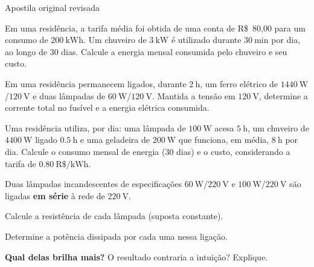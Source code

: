 \begin{questao}[2]{Apostila original revisada}

Em uma residência, a tarifa média foi obtida de uma conta de
R\$~80,00 para um consumo de $\SI{200}{\kilo\watt\hour}$. Um chuveiro de
$\SI{3}{\kilo\watt}$ é utilizado durante $\SI{30}{\minute}$ por dia, ao longo de
30 dias. Calcule a energia mensal consumida pelo chuveiro e seu custo.


\end{questao}

\blocoaprofundamento
\begin{questao}[3]{}

Em uma residência permanecem ligados, durante $\SI{2}{\hour}$, um ferro elétrico
de $\SI{1440}{\watt}$/$\SI{120}{\volt}$ e duas lâmpadas de
$\SI{60}{\watt}$/$\SI{120}{\volt}$. Mantida a tensão em $\SI{120}{\volt}$,
determine a corrente total no fusível e a energia elétrica consumida.


\end{questao}
\begin{questao}[3]{}

Uma residência utiliza, por dia: uma lâmpada de $\SI{100}{\watt}$ acesa
$\SI{5}{\hour}$, um chuveiro de $\SI{4400}{\watt}$ ligado $\SI{0.5}{\hour}$ e uma
geladeira de $\SI{200}{\watt}$ que funciona, em média, $\SI{8}{\hour}$ por dia.
Calcule o consumo mensal de energia (30 dias) e o custo, considerando a tarifa de
$\SI{0.80}{\text{R\$}\per\kilo\watt\hour}$.


\end{questao}
\begin{questao}[3]{}

Duas lâmpadas incandescentes de especificações $\SI{60}{\watt}$/$\SI{220}{\volt}$
e $\SI{100}{\watt}$/$\SI{220}{\volt}$ são ligadas \textbf{em série} à rede de
$\SI{220}{\volt}$.
\begin{itensq}
\item Calcule a resistência de cada lâmpada (suposta constante).
\item Determine a potência dissipada por cada uma nessa ligação.
\item \textbf{Qual delas brilha mais?} O resultado contraria a intuição?
      Explique.
\end{itensq}


\end{questao}
